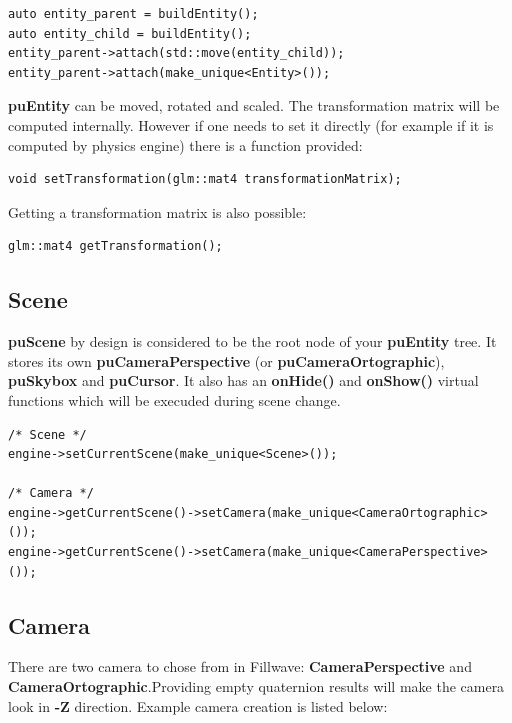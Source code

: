 \documentclass{article}
\begin{document}
\begin{lstlisting}
auto entity_parent = buildEntity();
auto entity_child = buildEntity();
entity_parent->attach(std::move(entity_child));
entity_parent->attach(make_unique<Entity>());
\end{lstlisting}

\indent \indent \textbf{puEntity} can be moved, rotated and scaled. The transformation matrix will be computed internally. However if one needs to set it directly (for example if it is computed by physics engine) there is a function provided:

\begin{lstlisting}
void setTransformation(glm::mat4 transformationMatrix);
\end{lstlisting}

\indent \indent Getting a transformation matrix is also possible:

\begin{lstlisting}
glm::mat4 getTransformation();
\end{lstlisting}

\subsection{Scene}\label{sec:Scene}
\indent \indent \textbf{puScene} by design is considered to be the root node of your \textbf{puEntity} tree. It stores its own \textbf{puCameraPerspective} (or \textbf{puCameraOrtographic}), \textbf{puSkybox} and \textbf{puCursor}. It also has an \textbf{onHide()} and \textbf{onShow()} virtual functions which will be execuded during scene change.

\begin{lstlisting}
/* Scene */
engine->setCurrentScene(make_unique<Scene>());

/* Camera */
engine->getCurrentScene()->setCamera(make_unique<CameraOrtographic>());
engine->getCurrentScene()->setCamera(make_unique<CameraPerspective>());
\end{lstlisting}

\subsection{Camera}\label{sec:Camera}

\indent \indent There are two camera to chose from in Fillwave: \textbf{CameraPerspective} and \textbf{CameraOrtographic}.Providing empty quaternion results will make the camera look in \textbf{-Z} direction. Example camera creation is listed below:
\end{document}
